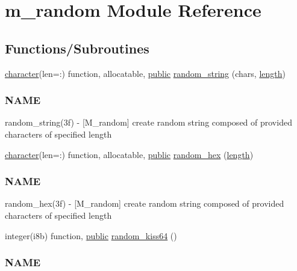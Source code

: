 \hypertarget{namespacem__random}{}\section{m\+\_\+random Module Reference}
\label{namespacem__random}
\subsection*{Functions/\+Subroutines}
\begin{DoxyCompactItemize}
\item 
\hyperlink{option__stopwatch_83_8txt_abd4b21fbbd175834027b5224bfe97e66}{character}(len=\+:) function, allocatable, \hyperlink{M__stopwatch_83_8txt_a2f74811300c361e53b430611a7d1769f}{public} \hyperlink{namespacem__random_aec553bcbd72af521bc24d9f81aea5652}{random\+\_\+string} (chars, \hyperlink{M__stopwatch_83_8txt_a04ed5ef37abacfa36a856b5f30376485}{length})
\begin{DoxyCompactList}\small\item\em \subsubsection*{N\+A\+ME}

random\+\_\+string(3f) -\/ \mbox{[}M\+\_\+random\mbox{]} create random string composed of provided characters of specified length \end{DoxyCompactList}\item 
\hyperlink{option__stopwatch_83_8txt_abd4b21fbbd175834027b5224bfe97e66}{character}(len=\+:) function, allocatable, \hyperlink{M__stopwatch_83_8txt_a2f74811300c361e53b430611a7d1769f}{public} \hyperlink{namespacem__random_a2fa2c1b1bcef16ff3be995981738cec0}{random\+\_\+hex} (\hyperlink{M__stopwatch_83_8txt_a04ed5ef37abacfa36a856b5f30376485}{length})
\begin{DoxyCompactList}\small\item\em \subsubsection*{N\+A\+ME}

random\+\_\+hex(3f) -\/ \mbox{[}M\+\_\+random\mbox{]} create random string composed of provided characters of specified length \end{DoxyCompactList}\item 
integer(i8b) function, \hyperlink{M__stopwatch_83_8txt_a2f74811300c361e53b430611a7d1769f}{public} \hyperlink{namespacem__random_a02085190ba5e6a34a61d89800f01a34b}{random\+\_\+kiss64} ()
\begin{DoxyCompactList}\small\item\em \subsubsection*{N\+A\+ME}


\end{DoxyCompactList}
\end{DoxyCompactItemize}
